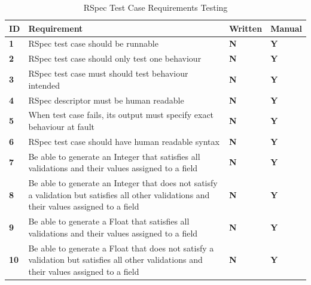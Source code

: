 \documentclass[a4paper,12pt]{article}
\begin{document}
\begin{table}
\centering
\caption{RSpec Test Case Requirements Testing}
\label{met:2}
\begin{tabularx}{\textwidth}{|l|X|l|l|}
\hline
\textbf{ID} & \textbf{Requirement}                                                                                                                       & \textbf{Written} & \textbf{Manual}  \\ \hline
\textbf{1}  & RSpec test case should be runnable                                                                                                         & \textbf{N}   & \textbf{Y}     \\ \hline
\textbf{2}  & RSpec test case should only test one behaviour                                                                                             & \textbf{N}   & \textbf{Y}       \\ \hline
\textbf{3}  & RSpec test case must should test behaviour intended                                                                                    & \textbf{N}   & \textbf{Y}        \\ \hline
\textbf{4}  & RSpec descriptor must be human readable                                                                                                    & \textbf{N}   & \textbf{Y}       \\ \hline
\textbf{5}  & When test case fails, its output must specify exact behaviour at fault                                                                     & \textbf{N}   & \textbf{Y}    \\ \hline
\textbf{6}  & RSpec test case should have human readable syntax                                                                                & \textbf{N}   & \textbf{Y}     \\ \hline
\textbf{7}  & Be able to generate an Integer that satisfies all validations and their values assigned to a field                                         & \textbf{N}   & \textbf{Y}       \\ \hline
\textbf{8}  & Be able to generate an Integer that does not satisfy a validation but satisfies all other validations and their values assigned to a field  & \textbf{N}   & \textbf{Y}       \\ \hline
\textbf{9}  & Be able to generate a Float that satisfies all validations and their values assigned to a field                                             & \textbf{N}   & \textbf{Y}       \\ \hline
\textbf{10} & Be able to generate a Float that does not satisfy a validation but satisfies all other validations and their values assigned to a field    & \textbf{N}   & \textbf{Y}  \\ \hline

\end{tabularx}
\end{table}
\end{document}
